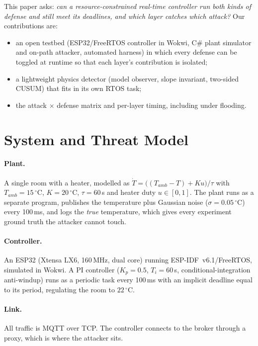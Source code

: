 \documentclass[10pt,twocolumn]{article}
\begin{document}
This paper asks: \emph{can a resource-constrained real-time controller run both
kinds of defense and still meet its deadlines, and which layer catches which
attack?} Our contributions are:
\begin{itemize}
  \item an open testbed (ESP32/FreeRTOS controller in Wokwi, C\# plant
        simulator and on-path attacker, automated harness) in which every
        defense can be toggled at runtime so that each layer's contribution is
        isolated;
  \item a lightweight physics detector (model observer, slope invariant,
        two-sided CUSUM) that fits in its own RTOS task;
  \item the attack $\times$ defense matrix and per-layer timing, including under
        flooding.
\end{itemize}

\section{System and Threat Model}
\paragraph{Plant.} A single room with a heater, modelled as
$\dot T = \big((T_{amb} - T) + K u\big)/\tau$ with $T_{amb}=15\,^\circ$C,
$K=20\,^\circ$C, $\tau=60$\,s and heater duty $u\in[0,1]$. The plant runs as a
separate program, publishes the temperature plus Gaussian noise
($\sigma=0.05\,^\circ$C) every 100\,ms, and logs the \emph{true} temperature,
which gives every experiment ground truth the attacker cannot touch.

\paragraph{Controller.} An ESP32 (Xtensa LX6, 160\,MHz, dual core) running
ESP-IDF~v6.1/FreeRTOS, simulated in Wokwi. A PI controller
($K_p=0.5$, $T_i=60$\,s, conditional-integration anti-windup) runs as a periodic
task every 100\,ms with an implicit deadline equal to its period, regulating the
room to $22\,^\circ$C.

\paragraph{Link.} All traffic is MQTT over TCP. The controller connects to the
broker through a proxy, which is where the attacker sits.
\end{document}
